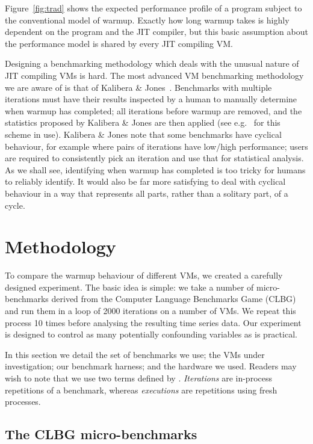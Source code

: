 \documentclass[10pt,preprint]{sigplanconf}
\newcommand{\kalibera}{Kalibera \& Jones\xspace}
\begin{document}
Figure~\ref{fig:trad} shows the expected performance profile of a
program subject to the conventional model of warmup. Exactly how long warmup
takes is highly dependent on
the program and the JIT compiler, but this basic assumption about the
performance model is shared by every JIT compiling VM.

Designing a benchmarking methodology which deals with the unusual nature of JIT
compiling VMs is hard. The most advanced VM benchmarking methodology we are
aware of is that of \kalibera~\cite{kalibera12quantifying,kalibera13rigorous}.
Benchmarks with multiple iterations must have their results inspected by a human
to manually determine when warmup has completed; all iterations before warmup
are removed, and the statistics proposed by \kalibera are then applied (see
e.g.~\cite{barrett15approaches,grimmer15dynamically} for this scheme in use).
\kalibera note that some benchmarks have cyclical behaviour, for example where
pairs of iterations have low/high performance; users are required to
consistently pick an iteration and use that for statistical analysis. As we
shall see, identifying when warmup has completed is too tricky for humans to
reliably identify. It would also be far more satisfying to deal with cyclical
behaviour in a way that represents all parts, rather than a solitary part, of a
cycle.


\section{Methodology}
\label{sec:methodology}

To compare the warmup behaviour of different VMs, we created a carefully
designed experiment. The basic idea is simple: we take a number of
micro-benchmarks derived from the Computer Language Benchmarks Game (CLBG) and
run them in a loop of 2000 iterations on a number of VMs. We repeat this
process 10 times before analysing the resulting time series data. Our
experiment is designed to control as many potentially confounding variables as
is practical.

In this section we detail the set of benchmarks we use; the VMs under
investigation; our benchmark harness;
and the hardware we used. Readers may wish to note that we use two terms defined
by \cite{kalibera13rigorous}. \emph{Iterations} are in-process repetitions of a
benchmark, whereas \emph{executions} are repetitions using fresh processes.


\subsection{The CLBG micro-benchmarks}
\end{document}

